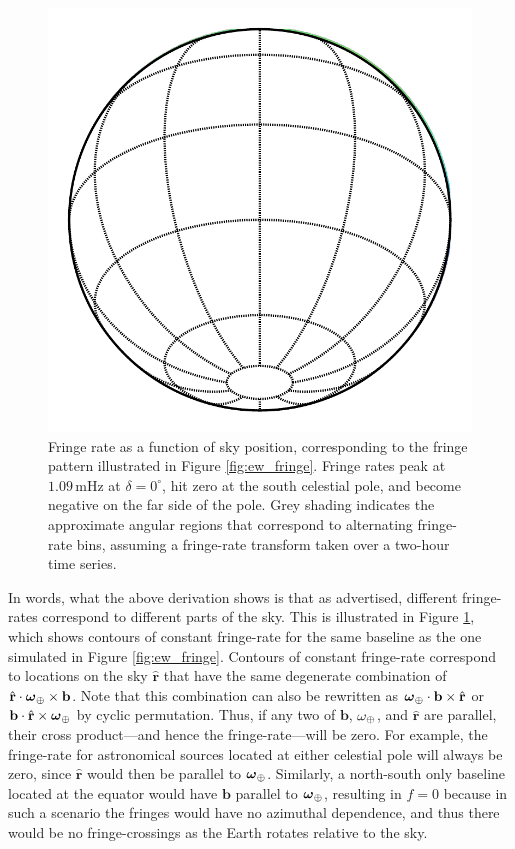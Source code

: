 \documentclass[twocolumn,apj,numberedappendix]{emulateapj}
\newcommand{\rhat}{\hat{\mathbf{r}}}
\begin{document}
\begin{figure}\centering
\includegraphics[width=.9\columnwidth]{plots/fringe_contours}
\caption{
Fringe rate as a function of sky position, corresponding to the fringe pattern illustrated in
Figure \ref{fig:ew_fringe}.  Fringe rates peak at $1.09\,\textrm{mHz}$ at $\delta=0^\circ$, hit zero at
the south celestial pole, and become negative on the far side of the pole.  Grey shading indicates
the approximate angular regions that correspond to alternating fringe-rate bins, assuming a
fringe-rate transform taken over a two-hour time series.
}\label{fig:fringe_contours}
\end{figure}

In words, what the above derivation shows is that as advertised, different fringe-rates correspond to different parts of the sky. This is illustrated in Figure \ref{fig:fringe_contours}, which shows contours of constant fringe-rate for the same baseline as the one simulated in Figure \ref{fig:ew_fringe}. Contours of constant fringe-rate correspond to locations on the sky $\rhat$ that have the same degenerate combination of $\rhat \cdot \boldsymbol \omega_\Earth \times \mathbf{b} $. Note that this combination can also be rewritten as $\boldsymbol \omega_\Earth \cdot \mathbf{b} \times \rhat $ or $\mathbf{b} \cdot \rhat \times  \boldsymbol \omega_\Earth $ by cyclic permutation. Thus, if any two of $\mathbf{b}$, $\omega_\oplus$, and $\rhat$ are parallel, their cross product---and hence the fringe-rate---will be zero. For example, the fringe-rate for astronomical sources located at either celestial pole will always be zero, since $\rhat$ would then be parallel to $\boldsymbol \omega_\oplus$. Similarly, a north-south only baseline located at the equator would have $\mathbf{b}$ parallel to $\boldsymbol \omega_\oplus$, resulting in $f=0$ because in such a scenario the fringes would have no azimuthal dependence, and thus there would be no fringe-crossings as the Earth rotates relative to the sky.
\end{document}

